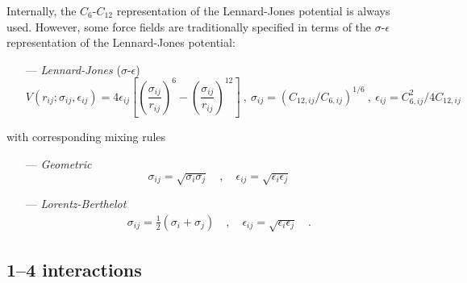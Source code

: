 \documentclass[10pt,a4paper]{report}
\numberwithin{equation}{section}
\begin{document}
Internally, the $C_6$-$C_{12}$ representation of the Lennard-Jones
potential is always used.  However, some force fields are
traditionally specified in terms of the $\sigma$-$\epsilon$
representation of the Lennard-Jones potential:
\begin{itemize}
  \item [---] \textit{Lennard-Jones} ($\sigma$-$\epsilon$)
\begin{equation}
  \label{eq:lj-sigma-epsilon-term}
  V(r_{ij}; \sigma_{ij}, \epsilon_{ij}) = 4\epsilon_{ij}\left[ \left(\frac{\sigma_{ij}}{r_{ij}}\right)^{6} - \left(\frac{\sigma_{ij}}{r_{ij}}\right)^{12}   \right] \ , \ \sigma_{ij} = (C_{12,ij}/C_{6,ij})^{1/6} \ , \ \epsilon_{ij} = C_{6,ij}^2/4C_{12,ij}
\end{equation}
\end{itemize}
with corresponding mixing rules
\begin{itemize}
\item [---] \textit{Geometric}
  \begin{equation}
    \label{eq:geometric-mix-sigma-epsilon}
  \sigma_{ij} = \sqrt{\sigma_i \sigma_j} \quad , \quad \epsilon_{ij} = \sqrt{\epsilon_i \epsilon_j}
  \end{equation}
\item [---]\textit{Lorentz-Berthelot}
  \begin{align}
    \label{eq:lorentz-mix-sigma-epsilon}
  \sigma_{ij} = \frac{1}{2}(\sigma_i + \sigma_j) \quad , \quad \epsilon_{ij} = \sqrt{\epsilon_i \epsilon_j} \quad .
  \end{align}
\end{itemize}

\subsection{1--4 interactions}
\label{sec:1-4-interactions}
\end{document}
